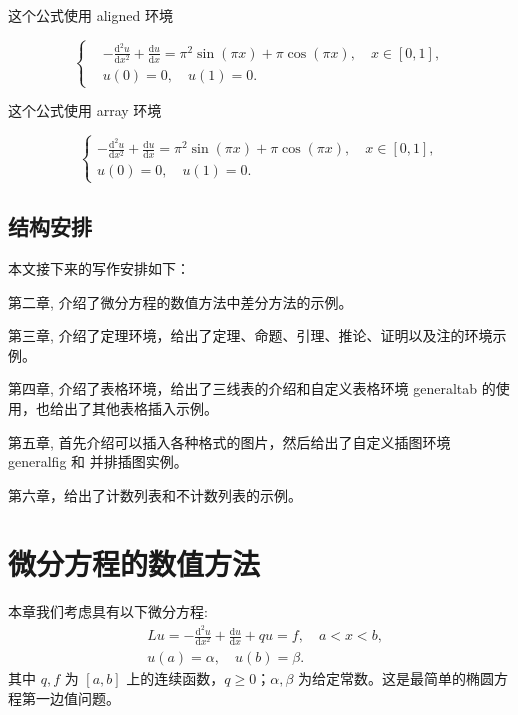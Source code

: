 \documentclass{shnuthesis}
\begin{document}
这个公式使用 aligned 环境

\begin{equation}\label{eq:equation1}
\left\{\begin{aligned}
  &-\frac{\mathrm{d}^{2} u}{\mathrm{d} x^{2}}+\frac{\mathrm{d} u}{\mathrm{d} x}=\pi^{2} \sin (\pi x)+\pi \cos (\pi x),\quad x \in [0,1], \\
  &u(0)=0,\quad u(1)=0.
\end{aligned} \right.
\end{equation}

这个公式使用 array 环境

\begin{equation}\label{eq:equation2}
\left\{\begin{array}{l}
\displaystyle
-\frac{\mathrm{d}^{2} u}{\mathrm{d} x^{2}}+\frac{\mathrm{d} u}{\mathrm{d} x}=\pi^{2} \sin (\pi x)+\pi \cos (\pi x),\quad x \in [0,1], \\[6pt]
u(0)=0,\quad u(1)=0.
\end{array} \right.
\end{equation}

\section{结构安排}

本文接下来的写作安排如下：

第二章,  介绍了微分方程的数值方法中差分方法的示例。

第三章, 介绍了定理环境，给出了定理、命题、引理、推论、证明以及注的环境示例。

第四章, 介绍了表格环境，给出了三线表的介绍和自定义表格环境 generaltab 的使用，也给出了其他表格插入示例。

第五章, 首先介绍可以插入各种格式的图片，然后给出了自定义插图环境 generalfig 和 并排插图实例。

第六章，给出了计数列表和不计数列表的示例。



\chapter{微分方程的数值方法}

本章我们考虑具有以下微分方程:
\begin{equation}\label{Equ11}
\begin{aligned}
& L u=-\frac{\mathrm{d}^{2} u}{\mathrm{d} x^{2}}+\frac{\mathrm{d} u}{\mathrm{d} x}+q u=f, \quad a < x < b, \\
&u(a)=\alpha, \quad u(b)=\beta.
\end{aligned}
\end{equation}
其中 $q, f$ 为 $[a,b]$ 上的连续函数，$q \geqslant 0$；$\alpha, \beta$ 为给定常数。这是最简单的椭圆方程第一边值问题。
\end{document}
